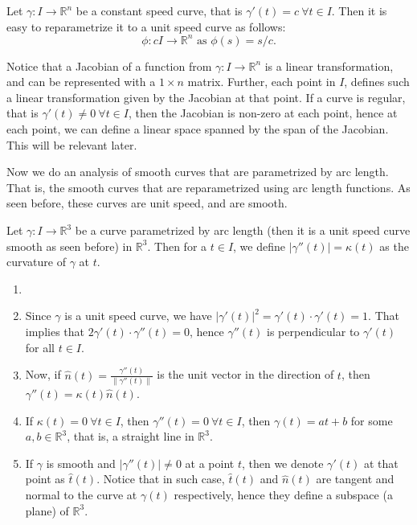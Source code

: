 \begin{eg}
    Let $\gamma:I\to\mathbb{R}^{n}$ be a constant speed curve, that is $\gamma'(t)=c~\forall t\in I$. Then it is easy to reparametrize it to a unit speed curve as follows: $$\phi:cI\to\mathbb{R}^{n}\text{ as }\phi(s)=s/c.$$
\end{eg}
\vspace{0.4cm}
\begin{note}
    Notice that a Jacobian of a function from $\gamma:I\to \mathbb{R}^{n}$ is a linear transformation, and can be represented with a $1\times n$ matrix. Further, each point in $I$, defines such a linear transformation given by the Jacobian at that point. If a curve is regular, that is $\gamma'(t)\neq0~\forall t\in I$, then the Jacobian is non-zero at each point, hence at each point, we can define a linear space spanned by the span of the Jacobian. This will be relevant later.
\end{note}
\vspace{0.4cm}
\begin{motive}
    Now we do an analysis of smooth curves that are parametrized by arc length. That is, the smooth curves that are reparametrized using arc length functions. As seen before, these curves are unit speed, and are smooth.
\end{motive}
\vspace{0.4cm}
\begin{definition}
    Let $\gamma:I\to \mathbb{R}^{3}$ be a curve parametrized by arc length (then it is a unit speed curve smooth as seen before) in $\mathbb{R}^{3}$. Then for a $t\in I$, we define $|\gamma''(t)|=\kappa(t)$ as the curvature of $\gamma$ at $t$.
\end{definition}
\vspace{0.4cm}
\begin{property}
    \begin{enumerate}[label=\roman*.]
        \item []
        \item Since $\gamma$ is a unit speed curve, we have $|\gamma'(t)|^{2}=\gamma'(t)\cdot\gamma'(t)=1$. That implies that $2\gamma'(t)\cdot\gamma''(t)=0$, hence $\gamma''(t)$ is perpendicular to $\gamma'(t)$ for all $t\in I$. 
        \item Now, if $\hat{n}(t)=\frac{\gamma''(t)}{\|\gamma''(t)\|}$ is the unit vector in the direction of $t$, then $\gamma''(t)=\kappa(t)\hat{n}(t)$.
        \item If $\kappa(t)=0~\forall t\in I$, then $\gamma''(t)=0~\forall t\in I$, then $\gamma(t)=at+b$ for some $a,b\in \mathbb{R}^{3}$, that is, a straight line in $\mathbb{R}^{3}$.
        \item If $\gamma$ is smooth and $|\gamma''(t)|\neq 0$ at a point $t$, then we denote $\gamma'(t)$ at that point as $\hat{t}(t)$. Notice that in such case, $\hat{t}(t)$ and $\hat{n}(t)$ are tangent and normal to the curve at $\gamma(t)$ respectively, hence they define a subspace (a plane) of $\mathbb{R}^{3}$.
    \end{enumerate}
\end{property}
